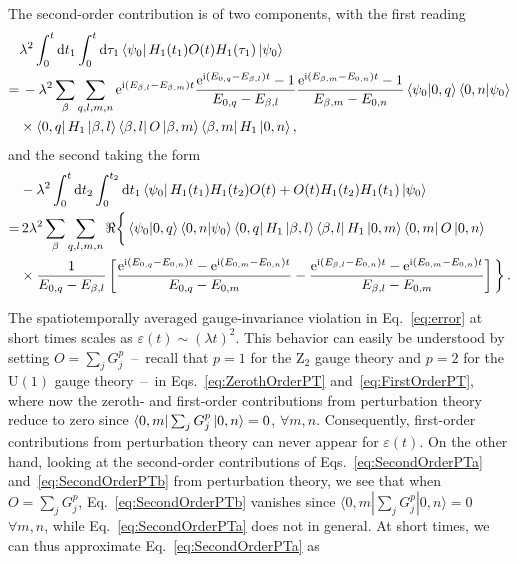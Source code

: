 \documentclass[aps,prl,reprint,twocolumn,superscriptaddress,floatfix,nofootinbib]{revtex4-1}
\def\d{\mathrm d}
\def\d{\mathrm d}
\begin{document}
The second-order contribution is of two components, with the first reading
\begin{align}\nonumber
&\lambda^2\int_0^t\d t_1\int_0^t\d \tau_1\bra{\psi_0}H_1(t_1)O(t)H_1(\tau_1)\ket{\psi_0}\\\nonumber
=&\,-\lambda^2\sum_{\beta}\sum_{q,l,m,n}\mathrm{e}^{\mathrm{i}(E_{\beta,l}-E_{\beta,m})t}\frac{\mathrm{e}^{\mathrm{i}(E_{0,q}-E_{\beta,l})t}-1}{E_{0,q}-E_{\beta,l}}\frac{\mathrm{e}^{\mathrm{i}(E_{\beta,m}-E_{0,n})t}-1}{E_{\beta,m}-E_{0,n}}\bra{\psi_0}\ket{0,q}\bra{0,n}\ket{\psi_0}\\\label{eq:SecondOrderPTa}
&\times\bra{0,q}H_1\ket{\beta,l}\bra{\beta,l}O\ket{\beta,m}\bra{\beta,m}H_1\ket{0,n},
\end{align}
and the second taking the form
\begin{align}\nonumber
&-\lambda^2\int_0^t\d t_2\int_0^{t_2}\d t_1\bra{\psi_0}H_1(t_1)H_1(t_2)O(t)+O(t)H_1(t_2)H_1(t_1)\ket{\psi_0}\\\nonumber
=&\,2\lambda^2\sum_{\beta}\sum_{q,l,m,n}\real\bigg\{\bra{\psi_0}\ket{0,q}\bra{0,n}\ket{\psi_0}\bra{0,q}H_1\ket{\beta,l}\bra{\beta,l}H_1\ket{0,m}\bra{0,m}O\ket{0,n}\\\label{eq:SecondOrderPTb}
&\times\frac{1}{E_{0,q}-E_{\beta,l}}\left[\frac{\mathrm{e}^{\mathrm{i}(E_{0,q}-E_{0,n})t}-\mathrm{e}^{\mathrm{i}(E_{0,m}-E_{0,n})t}}{E_{0,q}-E_{0,m}}-\frac{\mathrm{e}^{\mathrm{i}(E_{\beta,l}-E_{0,n})t}-\mathrm{e}^{\mathrm{i}(E_{0,m}-E_{0,n})t}}{E_{\beta,l}-E_{0,m}}\right]\bigg\}\,.
\end{align}

The spatiotemporally averaged gauge-invariance violation in Eq.~\eqref{eq:error} at short times scales as $\varepsilon(t)\sim(\lambda t)^2$. This behavior can easily be understood by setting $O=\sum_j G_j^p$~--~recall that $p=1$ for the $\mathrm{Z}_2$ gauge theory and $p=2$ for the $\mathrm{U}(1)$ gauge theory~--~in Eqs.~\eqref{eq:ZerothOrderPT} and~\eqref{eq:FirstOrderPT}, where now the zeroth- and first-order contributions from perturbation theory reduce to zero since $\bra{0,m}\sum_jG_j^p\ket{0,n}=0$, $\forall m,n$. Consequently, first-order contributions from perturbation theory can never appear for $\varepsilon(t)$. On the other hand, looking at the second-order contributions of Eqs.~\eqref{eq:SecondOrderPTa} and~\eqref{eq:SecondOrderPTb} from perturbation theory, we see that when $O=\sum_j G_j^p$, Eq.~\eqref{eq:SecondOrderPTb} vanishes since $\langle 0,m|\sum_j G_j^p|0,n\rangle=0$ $\forall m,n$, while Eq.~\eqref{eq:SecondOrderPTa} does not in general. At short times, we can thus approximate Eq.~\eqref{eq:SecondOrderPTa} as
\end{document}
